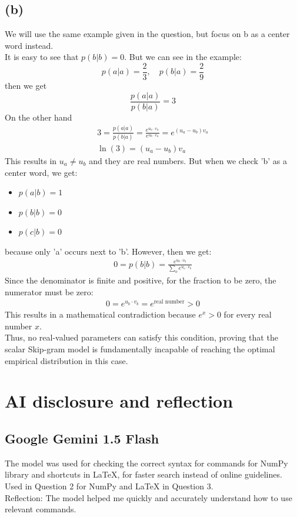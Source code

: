 \documentclass{article}
\begin{document}
\subsection*{(b)}
We will use the same example given in the question, but focus on b as a center word instead.\\
It is easy to see that $p(b|b) = 0$. But we can see in the example:
    $$p(a|a) = \frac{2}{3}, \quad p(b|a) = \frac{2}{9}$$
then we get
    $$\frac{p(a|a)}{p(b|a)} = 3$$
On the other hand
\begin{gather*}
    3 = \frac{p(a|a)}{p(b|a)} = \frac{e^{u_a \cdot v_a}}{e^{u_b \cdot v_a}} = e^{(u_a - u_b)v_a}\\
    \ln (3) = (u_a - u_b)v_a
\end{gather*}
This results in $u_a \ne u_b$ and they are real numbers. But when we check 'b' as a center word, we get:
\begin{itemize}
    \setlength{\itemsep}{0pt}
    \item $p(a|b) = 1$
    \item $p(b|b) = 0$
    \item $p(c|b) = 0$
\end{itemize}
because only 'a' occurs next to 'b'. However, then we get:
\begin{gather*}
    0 = p(b\vert{}b) = \frac{e^{u_b \cdot v_b}}{\sum_o e^{u_o \cdot v_b}}
\end{gather*}
Since the denominator is finite and positive, for the fraction to be zero, the numerator must be zero:
\begin{gather*}
    0 = e^{u_b \cdot v_b} = e^{\text{real number}} > 0
\end{gather*}
This results in a mathematical contradiction because $e^x > 0$ for every real number $x$.\\
Thus, no real-valued parameters can satisfy this condition, proving that the scalar Skip-gram model is fundamentally incapable of reaching the optimal empirical distribution in this case.


\clearpage
\section*{AI disclosure and reflection}

\subsection*{Google Gemini 1.5 Flash}

The model was used for checking the correct syntax for commands for NumPy library and shortcuts in LaTeX, for faster search instead of online guidelines. Used in Question 2 for NumPy and LaTeX in Question 3.\\
Reflection: The model helped me quickly and accurately understand how to use relevant commands.\\
\end{document}
